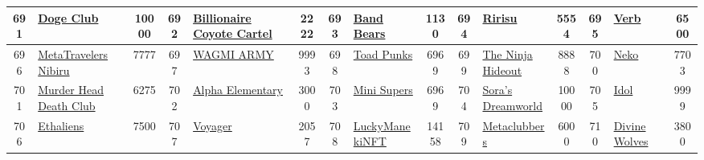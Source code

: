 \begin{table*}[]
{\begin{tabular}{|c|l|c|c|l|c|c|l|c|c|l|c|c|l|c|}
        691   & \href{https://www.dogc.xyz}{Doge Club}                                             & 10000             & 692   & \href{https://opensea.io/collection/billionaire-coyote-cartel}{Billionaire Coyote Cartel}         & 2222              & 693   & \href{http://bongbears.com}{Band Bears}                                           & 1130              & 694   & \href{https://www.ririsu.io}{Ririsu}                                          & 5554              & 695   & \href{http://www.verblabs.co}{Verb}                                                       & 6500                                    \\ \hline
        696   & \href{http://metatravelers.io}{MetaTravelers Nibiru}                               & 7777              & 697   & \href{https://wagmiarmy.io/}{WAGMI ARMY}                                                          & 9993              & 698   & \href{https://www.cryptoadpunks.xyz/}{Toad Punks}                                 & 6969              & 699   & \href{https://TheNinjaHideout.com}{The Ninja Hideout}                         & 8888              & 700   & \href{https://nekonft.io/}{Neko}                                                          & 7703                                    \\ \hline
        701   & \href{http://murderheaddeathclub.com}{Murder Head Death Club}                      & 6275              & 702   & \href{https://www.alphaelementary.io}{Alpha Elementary}                                           & 3000              & 703   & \href{https://minisupers.io}{Mini Supers}                                         & 6969              & 704   & \href{http://sorasdreamworld.io}{Sora's Dreamworld}                           & 10000             & 705   & \href{https://theidols.eth.limo/\#/marketplace}{Idol}                                     & 9999                                    \\ \hline
        706   & \href{http://artypass.com}{Ethaliens}                                              & 7500              & 707   & \href{https://monuse.com}{Voyager}                                                                & 2057              & 708   & \href{https://www.luckymaneki.org/}{LuckyManekiNFT}                               & 14158             & 709   & \href{https://metaclubsociety.com/}{Metaclubbers}                             & 6000              & 710   & \href{https://divinewolvesnft.com/}{Divine Wolves}                                        & 3800                                    \\ \hline

\end{tabular}}
\end{table*}
